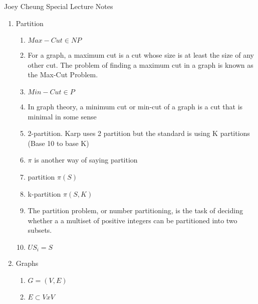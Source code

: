 \documentclass{article}
\begin{document}
\large %


{\Large Joey Cheung
\hfill  Special Lecture Notes}


\begin{enumerate}

\item Partition

\begin{enumerate}
    \item $Max-Cut \in{NP}$
    \item For a graph, a maximum cut is a cut whose size is at least the size of any other cut. The problem of finding a maximum cut in a graph is known as the Max-Cut Problem. 
    \item $Min-Cut \in{P}$
    \item In graph theory, a minimum cut or min-cut of a graph is a cut that is minimal in some sense
    \item 2-partition. Karp uses 2 partition but the standard is using K partitions (Base 10 to base K)
    \item $\pi$ {is another way of saying partition}
    \item partition $\pi(S)$
    \item k-partition $\pi(S,K)$
    \item The partition problem, or number partitioning, is the task of deciding whether a a multiset of positive integers can be partitioned into two subsets.
    \item $US_i = S$
\end{enumerate}

\item Graphs
\begin{enumerate}
    \item $G = (V,E)$
    \item $E \subset{VxV}$
\end{enumerate}


\end{enumerate}
\end{document}
